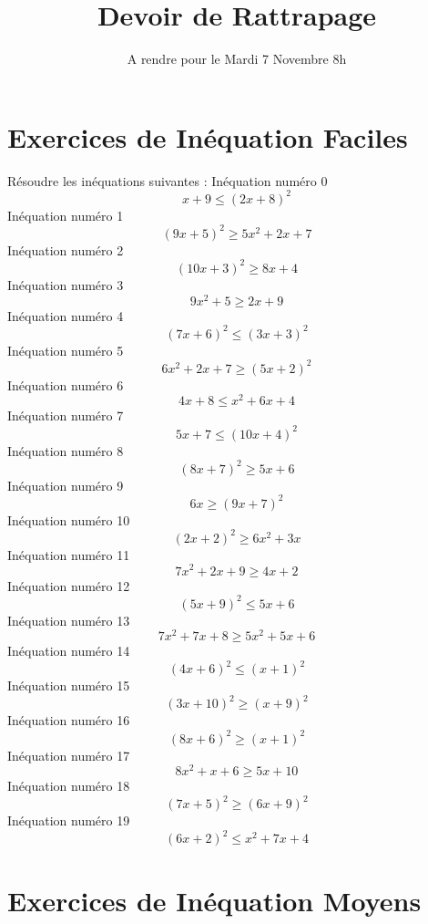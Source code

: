 \documentclass{article}
\title{Devoir de Rattrapage}
\date{A rendre pour le Mardi 7 Novembre 8h}\usepackage{natbib}
\begin{document}
\maketitle
 \section{Exercices de In\'equation Faciles}

 R\'esoudre les in\'equations suivantes : 
In\'equation num\'ero 0 \[x + 9 \leq \left(2 x + 8\right)^{2}\]In\'equation num\'ero 1 \[\left(9 x + 5\right)^{2} \geq 5 x^{2} + 2 x + 7\]In\'equation num\'ero 2 \[\left(10 x + 3\right)^{2} \geq 8 x + 4\]In\'equation num\'ero 3 \[9 x^{2} + 5 \geq 2 x + 9\]In\'equation num\'ero 4 \[\left(7 x + 6\right)^{2} \leq \left(3 x + 3\right)^{2}\]In\'equation num\'ero 5 \[6 x^{2} + 2 x + 7 \geq \left(5 x + 2\right)^{2}\]In\'equation num\'ero 6 \[4 x + 8 \leq x^{2} + 6 x + 4\]In\'equation num\'ero 7 \[5 x + 7 \leq \left(10 x + 4\right)^{2}\]In\'equation num\'ero 8 \[\left(8 x + 7\right)^{2} \geq 5 x + 6\]In\'equation num\'ero 9 \[6 x \geq \left(9 x + 7\right)^{2}\]In\'equation num\'ero 10 \[\left(2 x + 2\right)^{2} \geq 6 x^{2} + 3 x\]In\'equation num\'ero 11 \[7 x^{2} + 2 x + 9 \geq 4 x + 2\]In\'equation num\'ero 12 \[\left(5 x + 9\right)^{2} \leq 5 x + 6\]In\'equation num\'ero 13 \[7 x^{2} + 7 x + 8 \geq 5 x^{2} + 5 x + 6\]In\'equation num\'ero 14 \[\left(4 x + 6\right)^{2} \leq \left(x + 1\right)^{2}\]In\'equation num\'ero 15 \[\left(3 x + 10\right)^{2} \geq \left(x + 9\right)^{2}\]In\'equation num\'ero 16 \[\left(8 x + 6\right)^{2} \geq \left(x + 1\right)^{2}\]In\'equation num\'ero 17 \[8 x^{2} + x + 6 \geq 5 x + 10\]In\'equation num\'ero 18 \[\left(7 x + 5\right)^{2} \geq \left(6 x + 9\right)^{2}\]In\'equation num\'ero 19 \[\left(6 x + 2\right)^{2} \leq x^{2} + 7 x + 4\]
 \section{Exercices de In\'equation Moyens}
\end{document}
